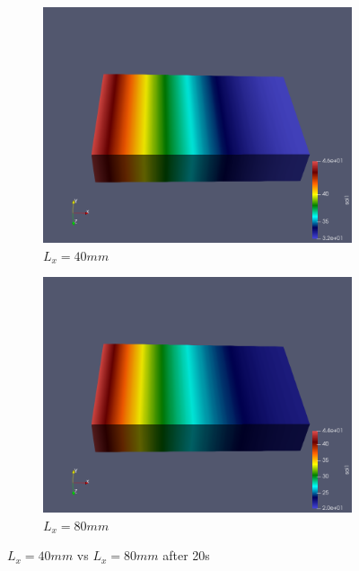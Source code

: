 \documentclass{article}
\begin{document}
\begin{figure}[H]
\begin{subfigure}{.5\textwidth}
  \centering
  \includegraphics[width=1\linewidth]{images/standard40_40s.png}
  \caption{$L_x=40mm$}
  \label{fig:sfig1}
\end{subfigure}
\begin{subfigure}{.5\textwidth}
  \centering
  \includegraphics[width=1\linewidth]{images/standard80_40s.png}
  \caption{$L_x=80mm$}
\end{subfigure}
\caption{$L_x=40mm$ vs $L_x=80mm$ after 20s }
\label{fig:fig}
\end{figure}
\end{document}
